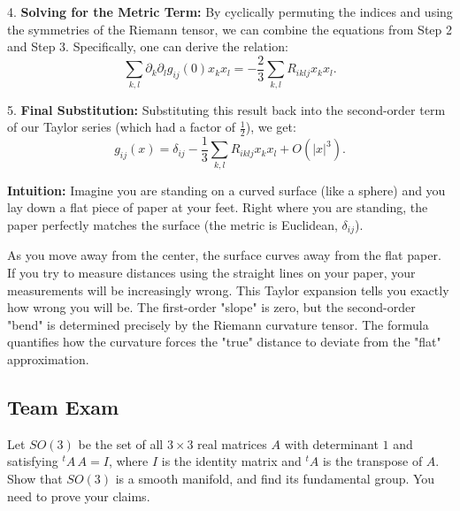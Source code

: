 \begin{solution}
4. \textbf{Solving for the Metric Term:}
By cyclically permuting the indices and using the symmetries of the Riemann tensor, we can combine the equations from Step 2 and Step 3. Specifically, one can derive the relation:
\[ \sum_{k,l} \partial_k \partial_l g_{ij}(0) x_k x_l = -\frac{2}{3} \sum_{k,l} R_{iklj} x_k x_l. \]
\par\vspace{\baselineskip}

5. \textbf{Final Substitution:}
Substituting this result back into the second-order term of our Taylor series (which had a factor of $\frac{1}{2}$), we get:
\[ g_{ij}(x) = \delta_{ij} - \frac{1}{3}\sum_{k,l} R_{iklj}x_kx_l + O(|x|^3). \]
\par\vspace{\baselineskip}

\textbf{Intuition:}
Imagine you are standing on a curved surface (like a sphere) and you lay down a flat piece of paper at your feet. Right where you are standing, the paper perfectly matches the surface (the metric is Euclidean, $\delta_{ij}$).
\par\vspace{\baselineskip}

As you move away from the center, the surface curves away from the flat paper. If you try to measure distances using the straight lines on your paper, your measurements will be increasingly wrong. This Taylor expansion tells you exactly how wrong you will be. The first-order "slope" is zero, but the second-order "bend" is determined precisely by the Riemann curvature tensor. The formula quantifies how the curvature forces the "true" distance to deviate from the "flat" approximation.
\end{solution}

\subsection{Team Exam}

\begin{exercise}
\label{geometry:2015:7}
Let $SO(3)$ be the set of all $3 \times 3$ real matrices $A$ with determinant $1$ and satisfying ${}^{t}\!A\,A = I$, where $I$ is the identity matrix and ${}^{t}\!A$ is the transpose of $A$. Show that $SO(3)$ is a smooth manifold, and find its fundamental group. You need to prove your claims.
\end{exercise}


